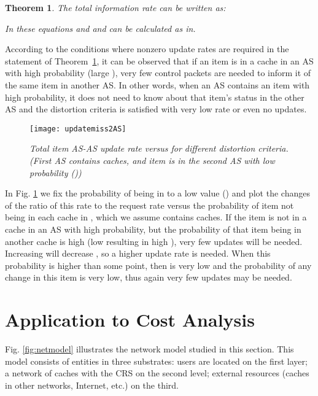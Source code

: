 \documentclass[conference]{IEEEtran}
\theoremstyle{plain}
\newtheorem{theorem}{Theorem}
\theoremstyle{remark}
\begin{document}
\begin{theorem}\label{thm:2}
The total information rate  can be written as:


In these equations 
and  and  can be calculated as in\cite{Dan1990Approximate}.
\end{theorem}

According to the conditions where nonzero update rates are required in the statement of Theorem~\ref{thm:2}, it can be observed that if an item is in a cache in an AS with high probability (large ), very few  control packets are needed to inform it of the same item in another AS. In other words, when an AS contains an item with high probability, it does not need to know about that item's status in the other AS and the distortion criteria is satisfied with very low rate or even no updates.

\begin{figure}[http]
    \center
      \texttt{[image: updatemiss2AS]}\\
      \caption{\textit{Total item  AS-AS update rate versus  for different distortion criteria. (First AS contains  caches, and item  is in the second AS with low probability ())}}
    \label{fig:updatemiss2AS}
\end{figure}

In Fig. \ref{fig:updatemiss2AS} we fix the probability of  being in  to a low value () and plot the changes of the ratio of this rate to the request rate versus the probability of item  not being in each cache in , which we assume contains  caches.
If the item is not in a cache in an AS with high probability, but the probability of that item being in another cache is high  (low  resulting in high ), very few updates will be needed. Increasing  will decrease , so a higher update rate is needed. When this probability is higher than some point, then  is very low and the probability of any change in this item is very low, thus again very few updates may be needed.

\section{Application to Cost Analysis}
\label{sec:costanalysis}



Fig. \ref{fig:netmodel} illustrates the network model studied in this section. This model consists of entities in three substrates: users are located on the first layer; a network of caches with the CRS on the second level; external resources (caches in other networks, Internet, etc.) on the third.
\end{document}
